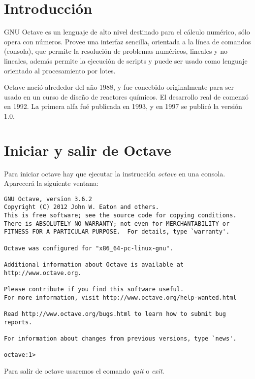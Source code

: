 \documentclass[a4,12pt]{article}
\begin{document}
\section{Introducción}
GNU Octave es un lenguaje de alto nivel destinado para el cálculo numérico, sólo opera con números. Provee una interfaz sencilla, orientada a la línea de comandos (consola), que permite la resolución de problemas numéricos, lineales y no lineales, además permite la ejecución de scripts y puede ser usado como lenguaje orientado al procesamiento por lotes.

Octave nació alrededor del año 1988, y fue concebido originalmente para ser usado en un curso de diseño de reactores químicos. El desarrollo real de comenzó en 1992. La primera alfa fué publicada en 1993, y en 1997 se publicó la versión 1.0.

\section{Iniciar y salir de Octave}
Para iniciar octave hay que ejecutar la instrucción \emph{octave} en una consola. Aparecerá la siguiente ventana:
\begin{verbatim}
GNU Octave, version 3.6.2
Copyright (C) 2012 John W. Eaton and others.
This is free software; see the source code for copying conditions.
There is ABSOLUTELY NO WARRANTY; not even for MERCHANTABILITY or
FITNESS FOR A PARTICULAR PURPOSE.  For details, type `warranty'.

Octave was configured for "x86_64-pc-linux-gnu".

Additional information about Octave is available at http://www.octave.org.

Please contribute if you find this software useful.
For more information, visit http://www.octave.org/help-wanted.html

Read http://www.octave.org/bugs.html to learn how to submit bug reports.

For information about changes from previous versions, type `news'.

octave:1>
\end{verbatim}

Para salir de octave usaremos el comando \emph{quit} o \emph{exit}.
\end{document}
